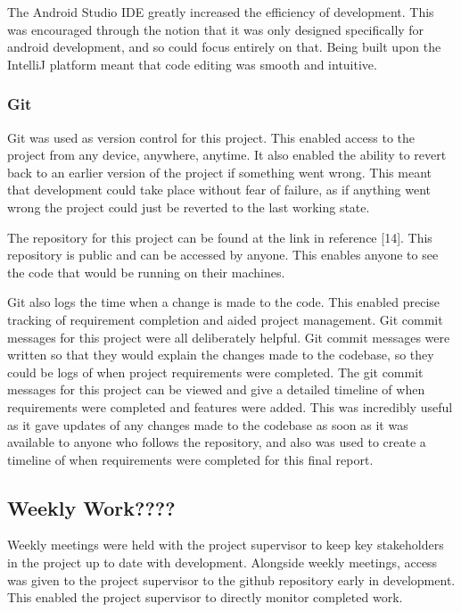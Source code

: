\documentclass{article}
\begin{document}
The Android Studio IDE greatly increased the efficiency of development. This was encouraged through the notion that it was only designed specifically for android development, and so could focus entirely on that. Being built upon the IntelliJ platform meant that code editing was smooth and intuitive. \par

\subsubsection{Git}

Git was used as version control for this project. This enabled access to the project from any device, anywhere, anytime. It also enabled the ability to revert back to an earlier version of the project if something went wrong. This meant that development could take place without fear of failure, as if anything went wrong the project could just be reverted to the last working state. \par

The repository for this project can be found at the link in reference [14]. This repository is public and can be accessed by anyone. This enables anyone to see the code that would be running on their machines. \par

Git also logs the time when a change is made to the code. This enabled precise tracking of requirement completion and aided project management. Git commit messages for this project were all deliberately helpful. Git commit messages were written so that they would explain the changes made to the codebase, so they could be logs of when project requirements were completed. The git commit messages for this project can be viewed and give a detailed timeline of when requirements were completed and features were added. This was incredibly useful as it gave updates of any changes made to the codebase as soon as it was available to anyone who follows the repository, and also was used to create a timeline of when requirements were completed for this final report. \par

\subsection{Weekly Work????}

Weekly meetings were held with the project supervisor to keep key stakeholders in the project up to date with development. Alongside weekly meetings, access was given to the project supervisor to the  github repository early in development. This enabled the project supervisor to directly monitor completed work. \par
\end{document}
